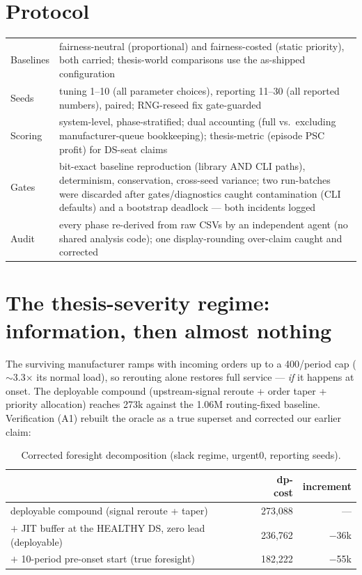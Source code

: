 \documentclass[11pt]{article}
\begin{document}
\section{Protocol}

\begin{table}[h]
\centering\small
\begin{tabular}{lp{10.8cm}}
\toprule
Baselines & fairness-neutral (proportional) and fairness-costed (static priority), both
carried; thesis-world comparisons use the as-shipped configuration \\
Seeds & tuning 1--10 (all parameter choices), reporting 11--30 (all reported numbers),
paired; RNG-reseed fix gate-guarded \\
Scoring & system-level, phase-stratified; dual accounting (full vs.\ excluding
manufacturer-queue bookkeeping); thesis-metric (episode PSC profit) for DS-seat claims \\
Gates & bit-exact baseline reproduction (library AND CLI paths), determinism, conservation,
cross-seed variance; two run-batches were discarded after gates/diagnostics caught
contamination (CLI defaults) and a bootstrap deadlock --- both incidents logged \\
Audit & every phase re-derived from raw CSVs by an independent agent (no shared analysis
code); one display-rounding over-claim caught and corrected \\
\bottomrule
\end{tabular}
\end{table}

\section{The thesis-severity regime: information, then almost nothing}

The surviving manufacturer ramps with incoming orders up to a 400/period cap
($\sim$3.3$\times$ its normal load), so rerouting alone restores full service ---
\emph{if} it happens at onset. The deployable compound (upstream-signal reroute + order
taper + priority allocation) reaches 273k against the 1.06M routing-fixed baseline.
Verification (A1) rebuilt the oracle as a true superset and corrected our earlier claim:

\begin{table}[h]
\centering\small
\caption{Corrected foresight decomposition (slack regime, urgent0, reporting seeds).}
\begin{tabular}{lrr}
\toprule
& \textbf{dp-cost} & \textbf{increment} \\
\midrule
deployable compound (signal reroute + taper) & 273,088 & --- \\
$+$ JIT buffer at the HEALTHY DS, zero lead (deployable) & 236,762 & $-$36k \\
$+$ 10-period pre-onset start (true foresight) & 182,222 & $-$55k \\
\bottomrule
\end{tabular}
\end{table}
\end{document}
